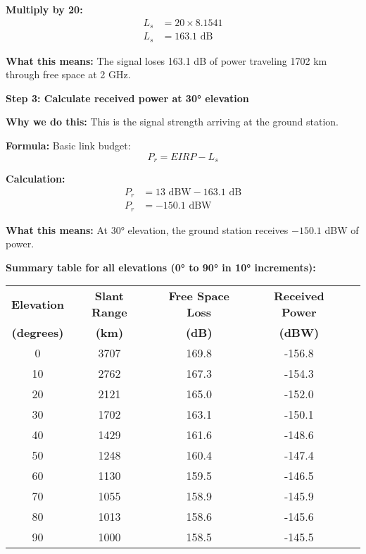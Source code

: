 \documentclass[11pt,letterpaper]{article}
\begin{document}
\textbf{Multiply by 20:}
\begin{align}
L_s &= 20 \times 8.1541 \\
L_s &= 163.1 \text{ dB}
\end{align}

\textbf{What this means:} The signal loses 163.1 dB of power traveling 1702 km through free space at 2 GHz.

\vspace{0.3cm}

\textbf{Step 3: Calculate received power at 30° elevation}

\textbf{Why we do this:} This is the signal strength arriving at the ground station.

\textbf{Formula:} Basic link budget:
\begin{equation}
P_r = EIRP - L_s
\end{equation}

\textbf{Calculation:}
\begin{align}
P_r &= 13 \text{ dBW} - 163.1 \text{ dB} \\
P_r &= -150.1 \text{ dBW}
\end{align}

\textbf{What this means:} At 30° elevation, the ground station receives $-150.1$ dBW of power.

\vspace{0.3cm}

\textbf{Summary table for all elevations (0° to 90° in 10° increments):}

\begin{center}
\begin{tabular}{@{}ccccc@{}}
\toprule
\textbf{Elevation} & \textbf{Slant Range} & \textbf{Free Space Loss} & \textbf{Received Power} \\
\textbf{(degrees)} & \textbf{(km)} & \textbf{(dB)} & \textbf{(dBW)} \\
\midrule
0  & 3707 & 169.8 & -156.8 \\
10 & 2762 & 167.3 & -154.3 \\
20 & 2121 & 165.0 & -152.0 \\
30 & 1702 & 163.1 & -150.1 \\
40 & 1429 & 161.6 & -148.6 \\
50 & 1248 & 160.4 & -147.4 \\
60 & 1130 & 159.5 & -146.5 \\
70 & 1055 & 158.9 & -145.9 \\
80 & 1013 & 158.6 & -145.6 \\
90 & 1000 & 158.5 & -145.5 \\
\bottomrule
\end{tabular}
\end{center}
\end{document}
